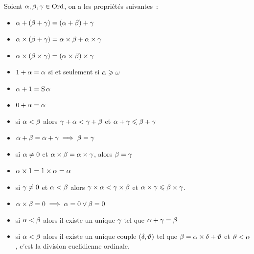 \begin{property}\label{prop.ord.arith}
  Soient $\alpha,\beta,\gamma\in\operatorname{Ord}$, on a les propriétés suivantes~:
  \begin{itemize}
  \item $\alpha + (\beta + \gamma) = (\alpha + \beta) + \gamma$
  \item $\alpha\times(\beta+\gamma) = \alpha\times\beta+\alpha\times\gamma$
  \item $\alpha\times(\beta\times\gamma) = (\alpha\times\beta)\times \gamma$
  \item $1 + \alpha = \alpha$ si et seulement si $\alpha \geqslant \omega$
  \item $\alpha + 1 = \operatorname{S}\alpha$
  \item $0 + \alpha = \alpha$
  \item si $\alpha < \beta$ alors $\gamma + \alpha < \gamma + \beta$ et
    $\alpha + \gamma \leqslant \beta + \gamma$
  \item $\alpha + \beta = \alpha + \gamma \implies \beta = \gamma$
  \item si $\alpha \neq 0$ et $\alpha \times \beta = \alpha \times \gamma$,
    alors $\beta = \gamma$
  \item $\alpha \times 1 = 1 \times \alpha = \alpha$
  \item si $\gamma \neq 0$ et $\alpha < \beta$ alors
    $\gamma \times \alpha < \gamma \times \beta$ et
    $\alpha\times\gamma\leqslant\beta\times\gamma$.
  \item $\alpha\times\beta = 0 \implies \alpha = 0 \lor \beta=0$
  \item si $\alpha < \beta$ alors il existe un unique $\gamma$ tel que
    $\alpha + \gamma = \beta$
  \item si $\alpha < \beta$ alors il existe un unique couple
    $(\delta,\vartheta)$ tel que $\beta = \alpha \times\delta + \vartheta$
    et $\vartheta < \alpha$, c'est la division euclidienne ordinale.
  \end{itemize}
\end{property}

